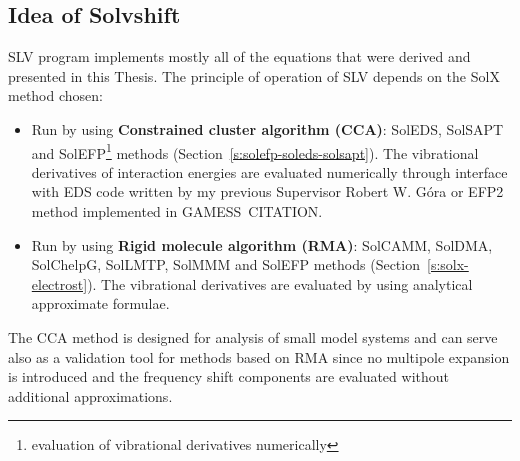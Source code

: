 \documentclass[a4paper,titlepage,twoside,fleqn,12pt]{book}
\begin{document}
\begin{refsection}
\section{Idea of Solvshift}

SLV program implements mostly all of the equations that were derived
and presented in this Thesis. 
The principle of operation of SLV depends on the SolX method chosen:
%
\begin{itemize}
  \item Run by using {\bf Constrained cluster algorithm (CCA)}:
        SolEDS, SolSAPT and SolEFP\footnote{evaluation of vibrational derivatives numerically} 
        methods (Section~\ref{s:solefp-soleds-solsapt}). The vibrational derivatives of interaction
        energies are evaluated numerically through interface with EDS code
        written by my previous Supervisor Robert W. G{\'o}ra \citep{Gora.EDS.1998-2010}
        or EFP2 method implemented in {\sc GAMESS}~CITATION.
  \item Run by using {\bf Rigid molecule algorithm (RMA)}:
        SolCAMM, SolDMA, SolChelpG, SolLMTP, SolMMM and SolEFP methods (Section~\ref{s:solx-electrost}).
        The vibrational derivatives are evaluated by using analytical approximate formulae.
\end{itemize}
%
The CCA method is designed for analysis of small model systems
and can serve also as a validation tool for methods based on RMA
since no multipole expansion is introduced and the frequency shift
components are evaluated without additional approximations.


\end{refsection}
\end{document}
